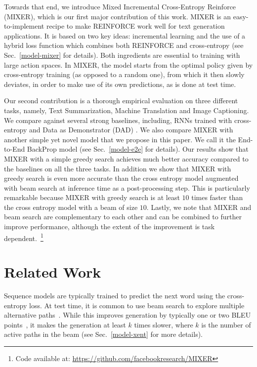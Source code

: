 \documentclass{article} \usepackage{iclr2016_conference,times}
\begin{document}
Towards that end, we introduce Mixed Incremental Cross-Entropy Reinforce (MIXER), which is our first major contribution of this work. MIXER is an easy-to-implement recipe to make REINFORCE work well for text generation applications. It is based on two key ideas: 
incremental learning and the use of a hybrid loss function which
combines both REINFORCE and cross-entropy (see Sec.~\ref{model-mixer} for details). Both ingredients are essential to training with large action spaces.
In MIXER, the model starts from the optimal policy given by cross-entropy training (as opposed to a random one), from which it then slowly deviates, 
in order to make use of its own predictions, as is done at test time.

Our second contribution is a thorough empirical evaluation on three 
different tasks, namely, Text Summarization, Machine Translation and Image Captioning.
We compare against several strong baselines, including, RNNs trained with cross-entropy and Data as Demonstrator (DAD) \citep{sbengio-nips2015, dad}. 
We also compare MIXER with another simple yet novel model that we propose in this paper. We call it the End-to-End BackProp model (see Sec.~\ref{model-e2e} for details). 
Our results show that MIXER with a simple greedy search achieves much better accuracy compared to the baselines on all the three tasks. In addition we show that MIXER with greedy search is even more accurate than the cross entropy model augmented with beam search at inference time as a post-processing step. This is particularly remarkable because MIXER with greedy search is at least $10$ times faster than the cross entropy model with a beam of size $10$. Lastly, we  note that MIXER and beam search are complementary to each other and can be combined to further improve performance, although the extent of the improvement is task dependent.~\footnote{Code available at: \url{https://github.com/facebookresearch/MIXER}}

\section{Related Work}
Sequence models are typically trained to predict the next
word using the cross-entropy loss. At test time, it is common to use beam search to 
explore  multiple alternative paths~\citep{sutskever2014,bahdanau-iclr2015,rush-2015}.
While this improves generation by typically one or two BLEU points~\citep{bleu}, 
it makes the generation at least $k$ times slower, where $k$ is the number of active 
paths in the beam (see Sec.~\ref{model-xent} for more details).
\end{document}
